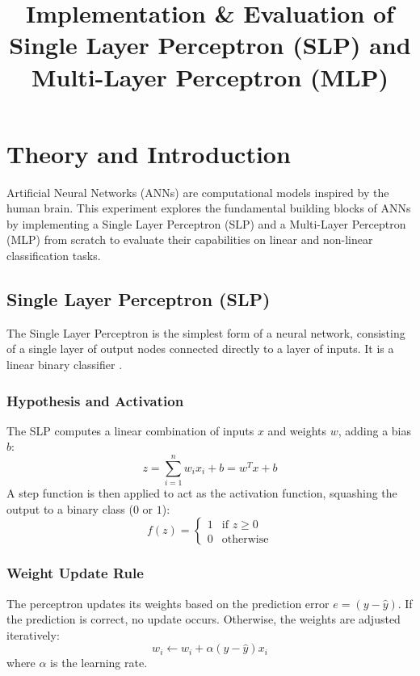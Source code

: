 \documentclass[11pt]{article}
\title{Implementation \& Evaluation of Single Layer Perceptron (SLP) and Multi-Layer Perceptron (MLP)}
\author{}
\date{}
\begin{document}


\pagebreak

\tableofcontents

\pagebreak
{}
\maketitle

\section{Theory and Introduction}
Artificial Neural Networks (ANNs) are computational models inspired by the human brain. This experiment explores the fundamental building blocks of ANNs by implementing a Single Layer Perceptron (SLP) and a Multi-Layer Perceptron (MLP) from scratch to evaluate their capabilities on linear and non-linear classification tasks.

\subsection{Single Layer Perceptron (SLP)}
The Single Layer Perceptron is the simplest form of a neural network, consisting of a single layer of output nodes connected directly to a layer of inputs. It is a linear binary classifier \cite{bishop2006pattern}.

\subsubsection*{Hypothesis and Activation}
The SLP computes a linear combination of inputs $x$ and weights $w$, adding a bias $b$:
\begin{equation}
    z = \sum_{i=1}^{n} w_i x_i + b = w^T x + b
\end{equation}
A step function is then applied to act as the activation function, squashing the output to a binary class ($0$ or $1$):
\begin{equation}
    f(z) =
    \begin{cases}
        1 & \text{if } z \geq 0 \\
        0 & \text{otherwise}
    \end{cases}
\end{equation}

\subsubsection*{Weight Update Rule}
The perceptron updates its weights based on the prediction error $e = (y - \hat{y})$. If the prediction is correct, no update occurs. Otherwise, the weights are adjusted iteratively:
\begin{equation}
    w_i \gets w_i + \alpha (y - \hat{y}) x_i
\end{equation}
where $\alpha$ is the learning rate.
\end{document}
